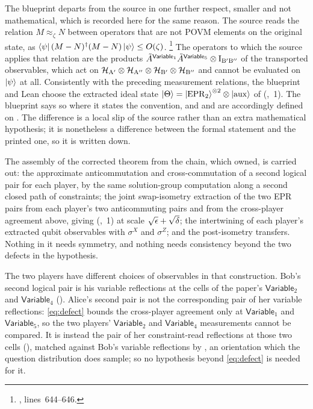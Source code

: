 \documentclass[11pt]{article}
\newcommand{\EPR}{\mathrm{EPR}}
\newcommand{\aux}{\mathrm{aux}}
\newcommand{\Id}{\mathrm{I}}
\newcommand{\mH}{\mathcal{H}}
\newcommand{\Variable}{\mathsf{Variable}}
\begin{document}
The blueprint departs from the source in one further respect, smaller and
not mathematical, which is recorded here for the same reason.  The source
reads the relation $M \approx_\zeta N$ between operators that are not POVM
elements on the original state, as
$\bra{\psi}(M-N)^\dagger(M-N)\ket{\psi} \le O(\zeta)$.%
\footnote{,
lines~644--646.}
The operators to which the source applies that relation are the products
$\tilde A^{\Variable_1} \tilde A^{\Variable_5} \ot \Id_{\mathrm{B'B''}}$ of the
transported observables, which act on
$\mH_{\mathrm A'} \ot \mH_{\mathrm A''} \ot \mH_{\mathrm B'} \ot
\mH_{\mathrm B''}$ and cannot be evaluated on $\ket{\psi}$ at all. Consistently
with the preceding measurement relations, the blueprint and Lean choose the extracted ideal state
$\ket{\Theta} = \ket{\EPR_2}^{\ot 2} \ot \ket{\aux}$ of
(,~1).  The blueprint says so where it states the
convention, and  and
 are accordingly defined on
.  The difference is a local slip of the
source rather than an extra mathematical hypothesis; it is nonetheless a difference
between the formal statement and the printed one, so it is written down.

The assembly of the corrected theorem from the chain, which 
owned, is carried out: the approximate anticommutation and cross-commutation
of a second logical pair for each player, by the same solution-group
computation along a second closed path of constraints; the joint
swap-isometry extraction of the two EPR pairs from each player's two
anticommuting pairs and from the cross-player agreement above, giving
(,~1) at scale $\sqrt{\epsilon} + \sqrt\delta$; the
intertwining of each player's extracted qubit observables with $\sigma^X$ and
$\sigma^Z$; and the post-isometry transfers.  Nothing in it needs symmetry,
and nothing needs consistency beyond the two defects in the hypothesis.

The two players have different choices of observables in that construction. Bob's
second logical pair is his variable reflections at the cells of the paper's
$\Variable_2$ and $\Variable_4$
().
Alice's second pair is not the corresponding pair of her variable reflections:
\eqref{eq:defect} bounds the cross-player agreement only at $\Variable_1$ and
$\Variable_5$, so the two players' $\Variable_2$ and $\Variable_4$
measurements cannot be compared.  It is instead the pair of her constraint-read
reflections at those two cells
(),
matched against Bob's variable reflections by
, an
orientation which the question distribution does sample; so no hypothesis
beyond \eqref{eq:defect} is needed for it.
\end{document}
